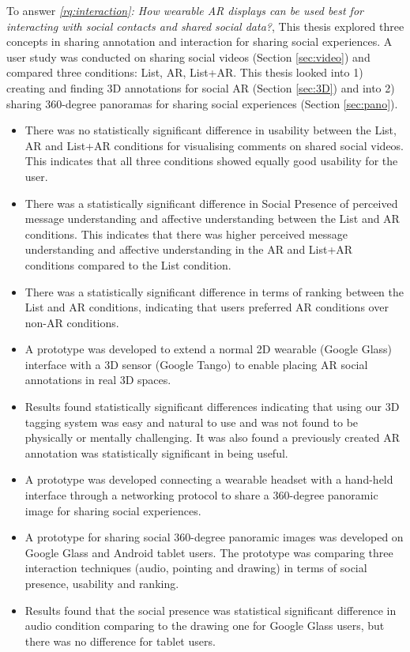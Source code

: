 \noindent
To answer \textit{\ref{rq:interaction}: How wearable AR displays can be used best for interacting with social contacts and shared social data?}, This thesis explored three concepts in sharing annotation and interaction for sharing social experiences. A user study was conducted on sharing social videos (Section \ref{sec:video}) and compared three conditions: List, AR, List+AR. This thesis looked into 1) creating and finding 3D annotations for social AR (Section \ref{sec:3D}) and into 2) sharing 360-degree panoramas for sharing social experiences (Section \ref{sec:pano}). 

\begin{itemize}
    \item{There was no statistically significant difference in usability between the List, AR and List+AR conditions for visualising comments on shared social videos. This indicates that all three conditions showed equally good usability for the user.}
    \item{There was a statistically significant difference in Social Presence of perceived message understanding and affective understanding between the List and AR conditions. This indicates that there was higher perceived message understanding and affective understanding in the AR and List+AR conditions compared to the List condition.}
    \item{There was a statistically significant difference in terms of ranking between the List and AR conditions, indicating that users preferred AR conditions over non-AR conditions.}
    \item{A prototype was developed to extend a normal 2D wearable (Google Glass) interface with a 3D sensor (Google Tango) to enable placing AR social annotations in real 3D spaces.}
    \item{Results found statistically significant differences indicating that using our 3D tagging system was easy and natural to use and was not found to be physically or mentally challenging. It was also found a previously created AR annotation was statistically significant in being useful.}
    \item{A prototype was developed connecting a wearable headset with a hand-held interface through a networking protocol to share a 360-degree panoramic image for sharing social experiences.}
    \item{A prototype for sharing social 360-degree panoramic images was developed on Google Glass and Android tablet users. The prototype was comparing three interaction techniques (audio, pointing and drawing) in terms of social presence, usability and ranking.}
    \item{Results found that the social presence was statistical significant difference in audio condition comparing to the drawing one for Google Glass users, but there was no difference for tablet users.}
\end{itemize}

